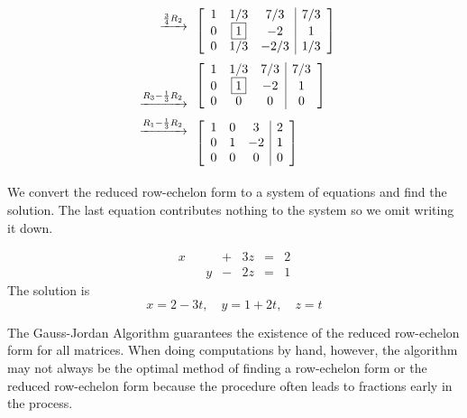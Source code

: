 \documentclass{ximera}
\begin{document}
\begin{example}
\begin{explanation}
\begin{align*}
\begin{array}{c}
 \xrightarrow{\frac{3}{4}R_2}\\
\\
\end{array}
&\left[\begin{array}{ccc|c} 
 1&1/3&7/3&7/3\\0&\fbox{$1$}&-2&1\\0&1/3&-2/3&1/3
 \end{array}\right]\\
 \begin{array}{c}
\\
\\
 \xrightarrow{R_3-\frac{1}{3}R_2}\\
\end{array}
&\left[\begin{array}{ccc|c} 
 1&1/3&7/3&7/3\\0&\fbox{$1$}&-2&1\\0&0&0&0
 \end{array}\right]\\
 \begin{array}{c}
 \xrightarrow{R_1-\frac{1}{3}R_2}\\
 \\
\\
\end{array}
&\left[\begin{array}{ccc|c} 
 1&0&3&2\\0&1&-2&1\\0&0&0&0
 \end{array}\right]
 \end{align*}
  
 We convert the reduced row-echelon form to a system of equations and find the solution.  The last equation contributes nothing to the system so we omit writing it down.
  
 $$\begin{array}{ccccccccc}
      x & &&+&3z&= &2 \\
     & &y&-&2z&=&1
    \end{array}$$
    The solution is
    $$x=2-3t,\quad y=1+2t,\quad z=t$$
\end{explanation}
\end{example}
The Gauss-Jordan Algorithm guarantees the existence of the reduced row-echelon form for all matrices. 
When doing computations by hand, however, the algorithm may not always be the optimal method of finding a row-echelon form or the reduced row-echelon form because the procedure often leads to fractions early in the process.
\end{document}
